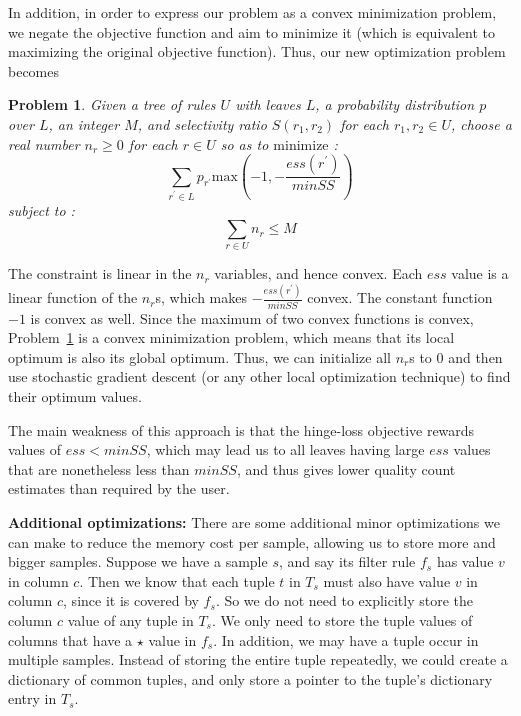 \documentclass[10pt,journal,compsoc]{IEEEtran}
\newcounter{prob}
\newtheorem{problem}[prob]{Problem}
\newcommand{\stitle}[1]{\vspace{0.5em}\noindent\textbf{#1}}
\begin{document}
In addition, in order to express our problem as a convex minimization problem, we negate the objective function and aim to minimize it (which is equivalent to maximizing the original objective function). Thus, our new optimization problem becomes
\begin{problem}\label{prob:sample-sizes-hinge-loss}
Given a tree of rules $U$ with leaves $L$, a probability distribution $p$ over $L$, an integer $M$, and selectivity ratio $S(r_1, r_2)$ for each $r_1, r_2 \in U$, 
choose a real number $n_r \geq 0$ for each $r \in U$ so as to $\textrm{minimize}$ :
$$\sum_{r^{\prime} \in L} p_{r^{\prime}}\textrm{max}\left(-1, -\frac{ess(r^{\prime})}{minSS}\right) $$
subject to :
$$\sum_{r \in U} n_r \leq M$$
\end{problem}
The constraint is linear in the $n_r$ variables, and hence convex. Each $ess$ value is a linear function of the $n_r$s, which makes $-\frac{ess(r^{\prime})}{minSS}$ convex. The constant function $-1$ is convex as well. Since the maximum of two convex functions is convex, Problem~\ref{prob:sample-sizes-hinge-loss} is a convex minimization problem, which means that its local optimum is also its global optimum. Thus, we can initialize all $n_r$s to $0$ and then use stochastic gradient descent (or any other local optimization technique) to find their optimum values. 

The main weakness of this approach is that the hinge-loss objective rewards values of $ess < minSS$, which may lead us to all leaves having large $ess$ values that are nonetheless less than $minSS$, and thus gives lower quality count estimates than required by the user.


\stitle{Additional optimizations:}
There are some additional minor optimizations we can make to reduce the memory cost per sample, allowing us to store more and bigger samples. Suppose we have a sample $s$, and say its filter rule $f_s$ has value $v$ in column $c$. Then we know that each tuple $t$ in $T_s$ must also have value $v$ in column $c$, since it is covered by $f_s$. So we do not need to explicitly store the column $c$ value of any tuple in $T_s$. We only need to store the tuple values of columns that have a $\star$ value in $f_s$. In addition, we may have a tuple occur in multiple samples. Instead of storing the entire tuple repeatedly, we could create a dictionary of common tuples, and only store a pointer to the tuple's dictionary entry in $T_s$. 
\end{document}
